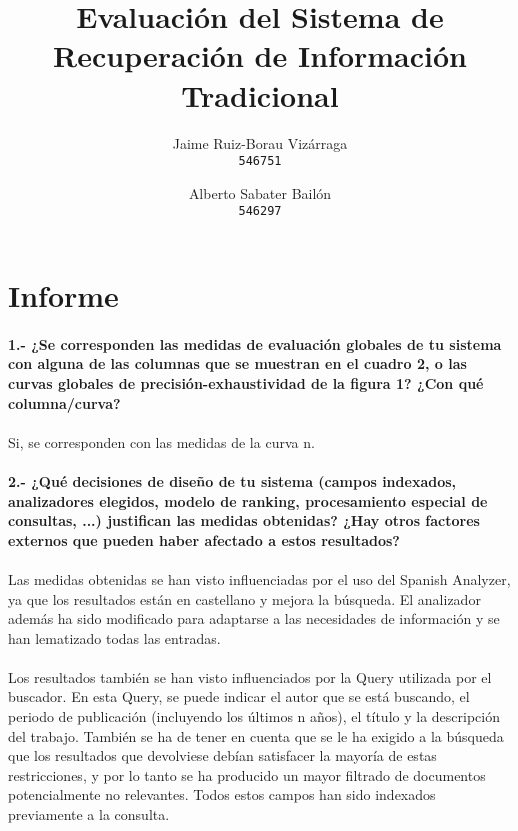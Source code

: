 \documentclass[a4paper]{article}
\begin{document}
\title{Evaluación del Sistema de Recuperación de Información Tradicional}
\author{
	Jaime Ruiz-Borau Vizárraga\\
	\texttt{546751}
	\and
	Alberto Sabater Bailón\\
	\texttt{546297}
	}
\date{}
\maketitle
\section{Informe}
\paragraph{1.- ¿Se corresponden las medidas de evaluación globales de tu sistema con alguna de las columnas que se muestran en el cuadro 2, o las curvas globales de precisión-exhaustividad de la figura 1? ¿Con qué columna/curva?}
\paragraph{}Si, se corresponden con las medidas de la curva n.
\paragraph{2.- ¿Qué decisiones de diseño de tu sistema (campos indexados, analizadores elegidos, modelo de ranking, procesamiento especial de consultas, ...) justifican las medidas obtenidas? ¿Hay otros factores externos que pueden haber afectado a estos resultados?}
\paragraph{}Las medidas obtenidas se han visto influenciadas por el uso del Spanish Analyzer, ya que los resultados están en castellano y mejora la búsqueda. El analizador además ha sido modificado para adaptarse a las necesidades de información y se han lematizado todas las entradas.
\paragraph{}Los resultados también se han visto influenciados por la Query utilizada por el buscador. En esta Query, se puede indicar el autor que se está buscando, el periodo de publicación (incluyendo los últimos n años), el título y la descripción del trabajo. También se ha de tener en cuenta que se le ha exigido a la búsqueda que los resultados que devolviese debían satisfacer la mayoría de estas restricciones, y por lo tanto se ha producido un mayor filtrado de documentos potencialmente no relevantes. Todos estos campos han sido indexados previamente a la consulta.
\end{document}
